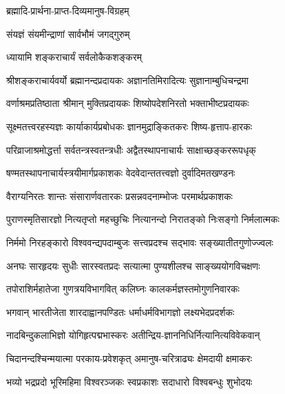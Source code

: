 

{ब्रह्मादि-प्रार्थना-प्राप्त-दिव्यमानुष-विग्रहम्}

{संयज्ञं संयमीन्द्राणां सार्वभौमं जगद्गुरुम्}

{ध्यायामि शङ्कराचार्यं सर्वलोकैकशङ्करम्	}

\begin{minipage}{\linewidth}
\centering
{}
\twolineshloka
{श्रीशङ्कराचार्यवर्यो ब्रह्मानन्दप्रदायकः}
{अज्ञानतिमिरादित्यः सुज्ञानाम्बुधिचन्द्रमा}
\end{minipage}

\twolineshloka
{वर्णाश्रमप्रतिष्ठाता श्रीमान् मुक्तिप्रदायकः}
{शिष्योपदेशनिरतो भक्ताभीष्टप्रदायकः}

\twolineshloka
{सूक्ष्मतत्त्वरहस्यज्ञः कार्याकार्यप्रबोधकः}
{ज्ञानमुद्राङ्कितकरः शिष्य-हृत्ताप-हारकः}

\twolineshloka
{परिव्राजाश्रमोद्धर्त्ता सर्वतन्त्रस्वतन्त्रधीः}
{अद्वैतस्थापनाचार्यः साक्षाच्छङ्कररूपधृक्}

\twolineshloka
{षण्मतस्थापनाचार्यस्त्रयीमार्गप्रकाशकः}
{वेदवेदान्ततत्त्वज्ञो दुर्वादिमतखण्डनः}

\twolineshloka
{वैराग्यनिरतः शान्तः संसारार्णवतारकः}
{प्रसन्नवदनाम्भोजः परमार्थप्रकाशकः}

\twolineshloka
{पुराणस्मृतिसारज्ञो नित्यतृप्तो महच्छुचिः}
{नित्यानन्दो निरातङ्को निःसङ्गो निर्मलात्मकः}

\twolineshloka
{निर्ममो निरहङ्कारो विश्ववन्द्यपदाम्बुजः}
{सत्त्वप्रदश्च सद्भावः सङ्ख्यातीतगुणोज्ज्वलः}

\twolineshloka
{अनघः सारहृदयः सुधीः सारस्वतप्रदः}
{सत्यात्मा पुण्यशीलश्च साङ्ख्ययोगविचक्षणः}

\twolineshloka
{तपोराशिर्महातेजा गुणत्रयविभागवित्}
{कलिघ्नः कालकर्मज्ञस्तमोगुणनिवारकः}

\twolineshloka
{भगवान् भारतीजेता शारदाह्वानपण्डितः}
{धर्माधर्मविभागज्ञो लक्ष्यभेदप्रदर्शकः}

\twolineshloka
{नादबिन्दुकलाभिज्ञो योगिहृत्पद्मभास्करः}
{अतीन्द्रिय-ज्ञाननिधिर्नित्यानित्यविवेकवान्}

\twolineshloka
{चिदानन्दश्चिन्मयात्मा परकाय-प्रवेशकृत्}
{अमानुष-चरित्राढ्यः क्षेमदायी क्षमाकरः}

\twolineshloka
{भव्यो भद्रप्रदो भूरिमहिमा विश्वरञ्जकः}
{स्वप्रकाशः सदाधारो विश्वबन्धुः शुभोदयः}

